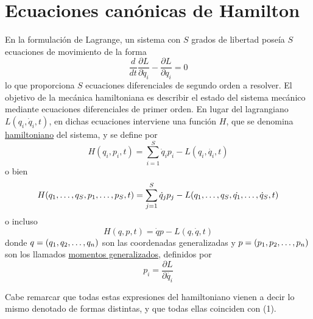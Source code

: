 \documentclass[12pt]{report}
\begin{document}
\section{Ecuaciones canónicas de Hamilton}

En la formulación de Lagrange, un sistema con $S$ grados de libertad poseía $S$ ecuaciones de movimiento de la forma
\[\frac{d}{dt}\frac{\partial L}{\partial \dot{q}_i} - \frac{\partial L}{\partial q_i} = 0 \tag{2}\]
lo que proporciona $S$ ecuaciones diferenciales de segundo orden a resolver. El objetivo de la mecánica hamiltoniana es describir el estado del sistema mecánico mediante ecuaciones diferenciales de primer orden. En lugar del lagrangiano $L(q_i, \dot{q}_i, t)$, en dichas ecuaciones interviene una función $H$, que se denomina \ul{hamiltoniano} del sistema, y se define por
\[H(q_i,p_i,t) = \sum_{i=1}^S \dot{q}_ip_i-L(q_i,\dot{q_i},t)\]
o bien
\[H(q_1,\mathellipsis,q_S,p_1,\mathellipsis,p_S,t) = \sum_{j=1}^S \dot{q}_jp_j-L(q_1,\mathellipsis,q_S,\dot{q_1},\mathellipsis,\dot{q}_S,t)\]
o incluso
\[H(q,p,t) = \dot{q}p-L(q,\dot{q},t)\]
donde $q = (q_1,q_2,\mathellipsis,q_n)$ son las coordenadas generalizadas y $p = (p_1,p_2,\mathellipsis,p_n)$ son los llamados \ul{momentos generalizados}, definidos por
\[p_i = \frac{\partial L}{\partial \dot{q_i}}\]

Cabe remarcar que todas estas expresiones del hamiltoniano vienen a decir lo mismo denotado de formas distintas, y que todas ellas coinciden con (1).
\end{document}
